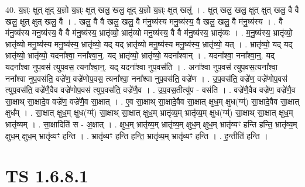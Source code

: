 \documentclass[17pt]{extarticle}
\begin{document}
40. य॒ज्ञ्ः क्षुत् क्षुद् य॒ज्ञो य॒ज्ञ्ः क्षुत् खलु॒ खलु॒ क्षुद् य॒ज्ञो य॒ज्ञ्ः क्षुत् खलु॑ । . क्षुत् खलु॒ खलु॒ क्षुत् क्षुत् खलु॒ वै वै खलु॒ क्षुत् क्षुत् खलु॒ वै । . खलु॒ वै वै खलु॒ खलु॒ वै म॑नु॒ष्य॑स्य मनु॒ष्य॑स्य॒ वै खलु॒ खलु॒ वै म॑नु॒ष्य॑स्य । . वै म॑नु॒ष्य॑स्य मनु॒ष्य॑स्य॒ वै वै म॑नु॒ष्य॑स्य॒ भ्रातृ॑व्यो॒ भ्रातृ॑व्यो मनु॒ष्य॑स्य॒ वै वै म॑नु॒ष्य॑स्य॒ भ्रातृ॑व्यः । . म॒नु॒ष्य॑स्य॒ भ्रातृ॑व्यो॒ भ्रातृ॑व्यो मनु॒ष्य॑स्य मनु॒ष्य॑स्य॒ भ्रातृ॑व्यो॒ यद् यद् भ्रातृ॑व्यो मनु॒ष्य॑स्य मनु॒ष्य॑स्य॒ भ्रातृ॑व्यो॒ यत् । . भ्रातृ॑व्यो॒ यद् यद् भ्रातृ॑व्यो॒ भ्रातृ॑व्यो॒ यदना᳚श्वा॒ नना᳚श्वा॒न्॒. यद् भ्रातृ॑व्यो॒ भ्रातृ॑व्यो॒ यदना᳚श्वान् । . यदना᳚श्वा॒ नना᳚श्वा॒न्॒. यद् यदना᳚श्वा नुप॒वस॑ त्युप॒वस॒ त्यना᳚श्वा॒न्॒. यद् यदना᳚श्वा नुप॒वस॑ति । . अना᳚श्वा नुप॒वस॑ त्युप॒वस॒त्यना᳚श्वा॒ नना᳚श्वा नुप॒वस॑ति॒ वज्रे॑ण॒ वज्रे॑णोप॒वस॒ त्यना᳚श्वा॒ नना᳚श्वा नुप॒वस॑ति॒ वज्रे॑ण । . उ॒प॒वस॑ति॒ वज्रे॑ण॒ वज्रे॑णोप॒वस॑ त्युप॒वस॑ति॒ वज्रे॑णै॒वैव वज्रे॑णोप॒वस॑ त्युप॒वस॑ति॒ वज्रे॑णै॒व । . उ॒प॒वस॒तीत्यु॑प - वस॑ति । . वज्रे॑णै॒वैव वज्रे॑ण॒ वज्रे॑णै॒व सा॒क्षाथ् सा॒क्षादे॒व वज्रे॑ण॒ वज्रे॑णै॒व सा॒क्षात् । . ए॒व सा॒क्षाथ् सा॒क्षादे॒वैव सा॒क्षात् क्षुध॒म् क्षुध(ग्म्॑) सा॒क्षादे॒वैव सा॒क्षात् क्षुध᳚म् । . सा॒क्षात् क्षुध॒म् क्षुध(ग्म्॑) सा॒क्षाथ् सा॒क्षात् क्षुध॒म् भ्रातृ॑व्य॒म् भ्रातृ॑व्य॒म् क्षुध(ग्म्॑) सा॒क्षाथ् सा॒क्षात् क्षुध॒म् भ्रातृ॑व्यम् । . सा॒क्षादिति॑ स - अ॒क्षात् । . क्षुध॒म् भ्रातृ॑व्य॒म् भ्रातृ॑व्य॒म् क्षुध॒म् क्षुध॒म् भ्रातृ॑व्यꣳ हन्ति हन्ति॒ भ्रातृ॑व्य॒म् क्षुध॒म् क्षुध॒म् भ्रातृ॑व्यꣳ हन्ति । . भ्रातृ॑व्यꣳ हन्ति हन्ति॒ भ्रातृ॑व्य॒म् भ्रातृ॑व्यꣳ हन्ति । . ह॒न्तीति॑ हन्ति । \newline
\pagebreak
{}
\section*{ TS 1.6.8.1 }
\end{document}

